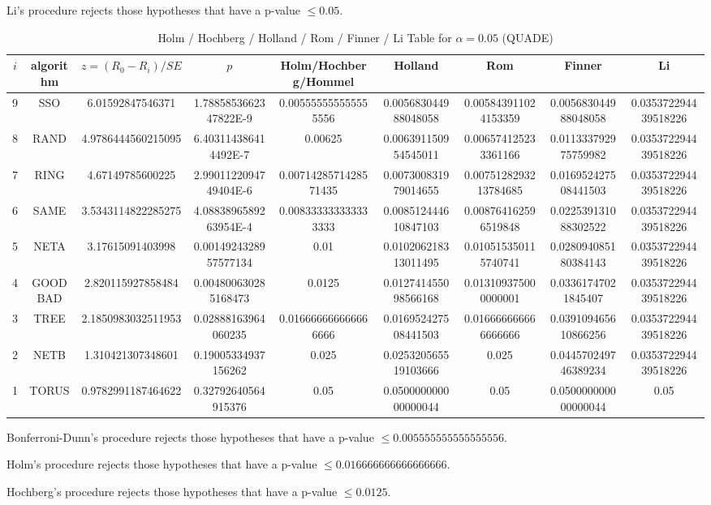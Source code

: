 \documentclass[a4paper,10pt]{article}
\begin{document}
\begin{landscape}
Li's procedure rejects those hypotheses that have a p-value $\le0.05$.



\newpage

\begin{table}[!htp]
\centering\scriptsize
\caption{Holm / Hochberg / Holland / Rom / Finner / Li Table for $\alpha=0.05$ (QUADE)}
\begin{tabular}{ccccccccc}
$i$&algorithm&$z=(R_0 - R_i)/SE$&$p$&Holm/Hochberg/Hommel&Holland&Rom&Finner&Li\\
\hline
9& SSO&6.01592847546371&1.7885853662347822E-9&0.005555555555555556&0.005683044988048058&0.005843911024153359&0.005683044988048058&0.035372294439518226\\
8& RAND&4.9786444560215095&6.403114386414492E-7&0.00625&0.006391150954545011&0.006574125233361166&0.011333792975759982&0.035372294439518226\\
7& RING&4.67149785600225&2.9901122094749404E-6&0.0071428571428571435&0.007300831979014655&0.0075128293213784685&0.016952427508441503&0.035372294439518226\\
6& SAME&3.5343114822285275&4.0883896589263954E-4&0.008333333333333333&0.008512444610847103&0.008764162596519848&0.022539131088302522&0.035372294439518226\\
5& NETA&3.17615091403998&0.0014924328957577134&0.01&0.010206218313011495&0.010515350115740741&0.028094085180384143&0.035372294439518226\\
4& GOODBAD&2.820115927858484&0.004800630285168473&0.0125&0.012741455098566168&0.013109375000000001&0.03361747021845407&0.035372294439518226\\
3& TREE&2.1850983032511953&0.02888163964060235&0.016666666666666666&0.016952427508441503&0.016666666666666666&0.039109465610866256&0.035372294439518226\\
2& NETB&1.310421307348601&0.19005334937156262&0.025&0.025320565519103666&0.025&0.044570249746389234&0.035372294439518226\\
1& TORUS&0.9782991187464622&0.32792640564915376&0.05&0.050000000000000044&0.05&0.050000000000000044&0.05\\
\hline
\end{tabular}
\end{table}
Bonferroni-Dunn's procedure rejects those hypotheses that have a p-value $\le0.005555555555555556$.


Holm's procedure rejects those hypotheses that have a p-value $\le0.016666666666666666$.


Hochberg's procedure rejects those hypotheses that have a p-value $\le0.0125$.



\end{landscape}
\end{document}
